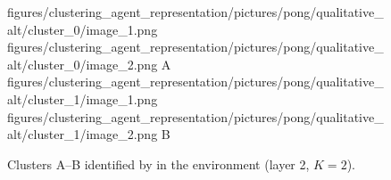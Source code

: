 \begin{figure}[H]
    \qualitativeClusterFigureSetup
    \qualitativeClusterTwo
        {figures/clustering_agent_representation/pictures/pong/qualitative_alt/cluster_0/image_1.png}
        {figures/clustering_agent_representation/pictures/pong/qualitative_alt/cluster_0/image_2.png}
        {A}
    \qualitativeClusterTwo
        {figures/clustering_agent_representation/pictures/pong/qualitative_alt/cluster_1/image_1.png}
        {figures/clustering_agent_representation/pictures/pong/qualitative_alt/cluster_1/image_2.png}
        {B}
    \caption{Clusters A--B identified by  in the \PongName environment (layer 2, $K=2$).}
    \label{fig:qualitative_pong_alt}
\end{figure}

